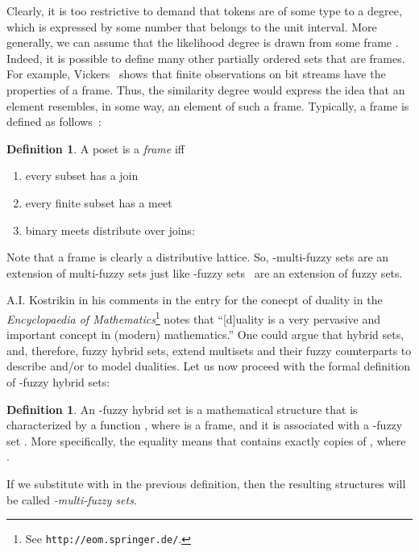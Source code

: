 \documentclass{amsart}
\theoremstyle{definition}
\newtheorem{definition}[theorem]{Definition}
\begin{document}
Clearly, it is too restrictive to demand that tokens are of some type to a
degree, which is expressed by some number that belongs to the unit interval. 
More generally, we can assume that the likelihood degree is drawn from some
frame . Indeed, it is possible to define many other partially ordered sets
that are frames. For example, Vickers~\cite{vickers90} shows that finite
observations on bit streams have the properties of a frame. Thus, the similarity
degree would express the idea that an element resembles, in some way, an element 
of such a frame. Typically, a frame is defined as follows~\cite{vickers90}:
\begin{definition}
A poset  is a {\em frame} iff
\begin{enumerate}
\item every subset has a join
\item every finite subset has a meet
\item binary meets distribute over joins:

\end{enumerate}
\end{definition}
\iffalse
\begin{itemize}
\item  is a nonempty set;
\item  and  are binary operations on ;
\item  both  and  are
   \begin{itemize}
    \item idempotent (i.e.,  and );
    \item commutative (i.e., and );
    \item associative (i.e.,  and
          );
    \item distributive (i.e.,  and
          );
    \item and they satisfy the absorption law (i.e., ).
   \end{itemize}
\end{itemize}
\fi
Note that a frame is clearly a distributive lattice.
So, -multi-fuzzy sets are an extension of
multi-fuzzy sets just like -fuzzy sets~\cite{goguen67} are an extension
of fuzzy sets. 

A.I. Kostrikin in his comments in the entry for the conecpt of duality in the
{\em Encyclopaedia of Mathematics}\footnote{See \texttt{http://eom.springer.de/}.} notes
that ``[d]uality is a very pervasive and important concept in (modern) mathematics.''
One could argue that hybrid sets, and, therefore, fuzzy hybrid sets, extend multisets and
their fuzzy counterparts to describe and/or to model dualities. Let us now proceed with the 
formal definition of -fuzzy hybrid sets:
\begin{definition}\label{fuzzy:hybrid:set}
An -fuzzy hybrid set  is a mathematical structure that is
characterized by a function , 
where  is a frame, and it is associated with a -fuzzy set 
. More specifically, the equality  
means that  contains exactly  copies of , where
.  
\end{definition}
If we substitute  with  in the previous 
definition, then the resulting structures will be called {\em -multi-fuzzy sets}.   
\end{document}
